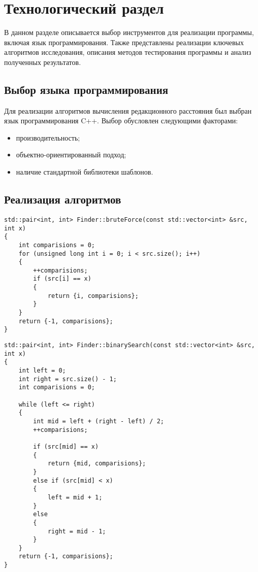 \chapter{Технологический раздел}
В данном разделе описывается выбор инструментов для реализации программы, включая язык программирования. Также представлены реализации ключевых алгоритмов исследования, описания методов тестирования программы и анализ полученных результатов.

\section{Выбор языка программирования}

Для реализации алгоритмов вычисления редакционного расстояния был выбран язык программирования C++. Выбор обусловлен следующими факторами:

\begin{itemize}[label=---]
	\item {производительность;}
	\item {объектно-ориентированный подход;}
	\item {наличие стандартной библиотеки шаблонов.}
\end{itemize}

\section{Реализация алгоритмов}

\begin{center}
	\captionsetup{justification=raggedright,singlelinecheck=off}
	\begin{lstlisting}[caption=Реализация алгоритма поиска полным перебором]
std::pair<int, int> Finder::bruteForce(const std::vector<int> &src, int x)
{
	int comparisions = 0;
	for (unsigned long int i = 0; i < src.size(); i++)
	{
		++comparisions;
		if (src[i] == x)
		{
			return {i, comparisions};
		}
	}
	return {-1, comparisions};
}
	\end{lstlisting}
\end{center}

\begin{center}
	\captionsetup{justification=raggedright,singlelinecheck=off}
	\begin{lstlisting}[caption=Реализация алгоритма бинарного поиска]
std::pair<int, int> Finder::binarySearch(const std::vector<int> &src, int x)
{
	int left = 0;
	int right = src.size() - 1;
	int comparisions = 0;
	
	while (left <= right)
	{
		int mid = left + (right - left) / 2;
		++comparisions;
		
		if (src[mid] == x)
		{
			return {mid, comparisions};
		}
		else if (src[mid] < x)
		{
			left = mid + 1;
		}
		else
		{
			right = mid - 1;
		}
	}
	return {-1, comparisions};
}
	\end{lstlisting}
\end{center}

